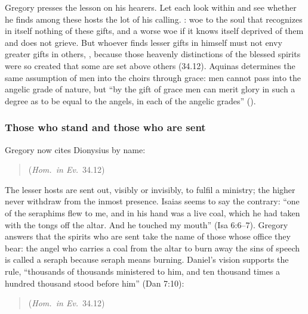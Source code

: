 Gregory presses the lesson on his hearers. Let each look within and see
whether he finds among these hosts the lot of his calling. : woe to the soul that recognizes in itself nothing of these
gifts, and a worse woe if it knows itself deprived of them and does not
grieve. But whoever finds lesser gifts in himself must not envy greater gifts
in others, , because those heavenly
distinctions of the blessed spirits were so created that some are set above
others (34.12). Aquinas determines the same assumption of men into the choirs
through grace: men cannot pass into the angelic grade of nature, but ``by
the gift of grace men can merit glory in such a degree as to be equal to the
angels, in each of the angelic grades'' ().

\subsubsection{Those who stand and those who are sent}

Gregory now cites Dionysius by name:

\begin{quote}
 (\emph{Hom.\ in
Ev.}\ 34.12)
\end{quote}

\noindent The lesser hosts are sent out, visibly or invisibly, to fulfil a
ministry; the higher never withdraw from the inmost presence. Isaias seems to
say the contrary: ``one of the seraphims
flew to me, and in his hand was a live coal, which he had taken with the
tongs off the altar. And he touched my mouth'' (Isa 6:6--7). Gregory answers
that the spirits who are sent take the name of those whose office they
bear: the angel who carries a coal from the altar to burn away the sins of
speech is called a seraph because seraph means burning. Daniel's vision
supports the rule, ``thousands of thousands ministered to him, and ten
thousand times a hundred thousand stood before him'' (Dan 7:10):

\begin{quote}
 (\emph{Hom.\ in
Ev.}\ 34.12)
\end{quote}

